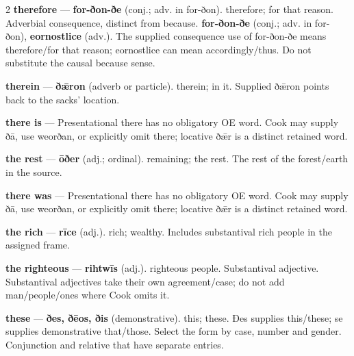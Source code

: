 \begin{multicols}{2}
\textbf{therefore} — \textbf{for-ðon-ðe} (conj.; adv. in for-ðon). therefore; for that reason. Adverbial consequence, distinct from because. \textbf{for-ðon-ðe} (conj.; adv. in for-ðon), \textbf{eornostlice} (adv.). The supplied consequence use of for-ðon-ðe means therefore/for that reason; eornostlice can mean accordingly/thus. Do not substitute the causal because sense.\par
\textbf{therein} — \textbf{ðǣron} (adverb or particle). therein; in it. Supplied ðǣron points back to the sacks' location.\par
\textbf{there is} — Presentational there has no obligatory OE word. Cook may supply ðā, use weorðan, or explicitly omit there; locative ðǣr is a distinct retained word.\par
\textbf{the rest} — \textbf{ōðer} (adj.; ordinal). remaining; the rest. The rest of the forest/earth in the source.\par
\textbf{there was} — Presentational there has no obligatory OE word. Cook may supply ðā, use weorðan, or explicitly omit there; locative ðǣr is a distinct retained word.\par
\textbf{the rich} — \textbf{rīce} (adj.). rich; wealthy. Includes substantival rich people in the assigned frame.\par
\textbf{the righteous} — \textbf{rihtwīs} (adj.). righteous people. Substantival adjective. Substantival adjectives take their own agreement/case; do not add man/people/ones where Cook omits it.\par
\textbf{these} — \textbf{ðes, ðēos, ðis} (demonstrative). this; these. Ðes supplies this/these; se supplies demonstrative that/those. Select the form by case, number and gender. Conjunction and relative that have separate entries.\par

\end{multicols}

